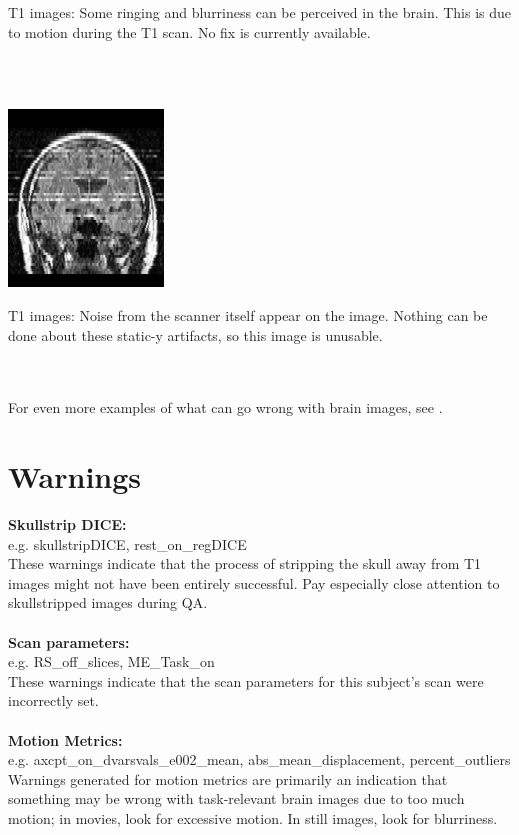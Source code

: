 \documentclass{article}
\begin{document}
\hfill%
\begin{minipage}{0.6\textwidth}
	T1 images: Some ringing and blurriness can be perceived in the brain. This is due to motion during the T1 scan. No fix is currently available. 
\end{minipage}\\\\
\noindent\begin{minipage}{0.3\textwidth}
	\includegraphics[scale=0.735]{T1_bad2.png}
\end{minipage}%
\hfill%
\begin{minipage}{0.6\textwidth}
	T1 images: Noise from the scanner itself appear on the image. Nothing can be done about these static-y artifacts, so this image is unusable. 
\end{minipage}
\\\\
For even more examples of what can go wrong with brain images, see \href{http://cbs.fas.harvard.edu/usr/mcmains/CBS_MRI_Quality_Control_Workshop.pdf}{\color{cyan}{this}}.
\section{Warnings}
\textbf{Skullstrip DICE:} \\
e.g. skullstripDICE, rest\_on\_regDICE\\
These warnings indicate that the process of stripping the skull away from T1 images might not have been entirely successful. Pay especially close attention to skullstripped images during QA.\\\\
\textbf{Scan parameters:} \\
e.g. RS\_off\_slices, ME\_Task\_on\\
These warnings indicate that the scan parameters for this subject's scan were incorrectly set.\\\\
\textbf{Motion Metrics:} \\
e.g. axcpt\_on\_dvarsvals\_e002\_mean, abs\_mean\_displacement, percent\_outliers\\
 Warnings generated for motion metrics are primarily an indication that something may be wrong with task-relevant brain images due to too much motion; in movies, look for excessive motion. In still images, look for blurriness. 
\end{document}
